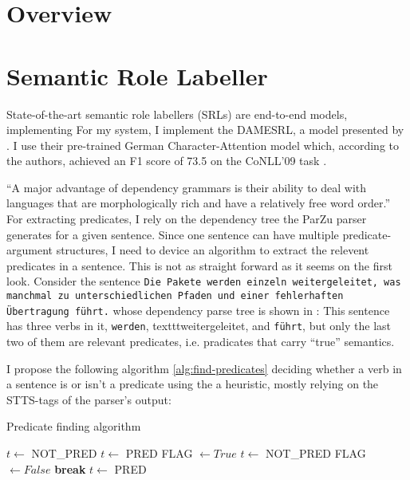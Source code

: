 
\label{chap:4_architecture}

\section{Overview}

\section{Semantic Role Labeller}

State-of-the-art semantic role labellers (SRLs) are end-to-end models, implementing 
For my system, I implement the DAMESRL, a model presented by \cite{do2018flexible}.
I use their pre-trained German Character-Attention model which, according to the authors, achieved an F1 score of 73.5 on the CoNLL'09 task \citep{hajivc2009conll}.

``A major advantage of dependency grammars is their ability to deal with languages that are morphologically rich and have a relatively free word order.'' \citep[p.~274]{jurafsky2019speech}
For extracting predicates, I rely on the dependency tree the ParZu parser \cite{sennrich2013exploiting} generates for a given sentence.
Since one sentence can have multiple predicate-argument structures, I need to device an algorithm to extract the relevent predicates in a sentence.
This is not as straight forward as it seems on the first look.
Consider the sentence \texttt{Die Pakete werden einzeln weitergeleitet, was manchmal zu unterschiedlichen Pfaden und einer fehlerhaften Übertragung führt.} whose dependency parse tree is shown in :
This sentence has three verbs in it, \texttt{werden}, texttt{weitergeleitet}, and \texttt{führt}, but only the last two of them are relevant predicates, i.e. pradicates that carry ``true'' semantics.


I propose the following algorithm \ref{alg:find-predicates} deciding whether a verb in a sentence is or isn't a predicate using the a heuristic, mostly relying on the STTS-tags \citep{schiller1999guidelines} of the parser's output:

\begin{algorithm}
\caption{Predicate finding algorithm}
\label{alg:find-predicates}
\begin{algorithmic}
			\STATE $t \leftarrow$ NOT\_PRED
		\ELSE
				\STATE $t \leftarrow$ PRED
			\ELSE
				\STATE FLAG $\leftarrow True$
						\STATE $t \leftarrow$ NOT\_PRED
						\STATE FLAG $\leftarrow False$
						\STATE \textbf{break}
					\ENDIF
				\ENDFOR
				\IF{FLAG $= True$}
					\STATE $t \leftarrow$ PRED
				\ENDIF
			\ENDIF
		\ENDIF
	\ENDFOR
\end{algorithmic}
\end{algorithm}

